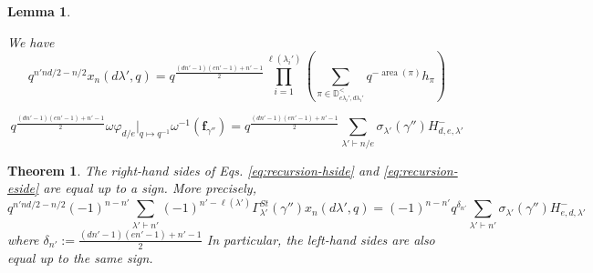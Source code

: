 \documentclass[10pt,a4paper]{amsart}
\newtheorem{lemma}{Lemma}
\newtheorem{theorem}{Theorem}
\newcommand{\Dyck}{\mathbb{D}}
\DeclareMathOperator{\area}{\mathrm{area}}
\begin{document}
\begin{lemma}
\label{lem:coareatoarea}

We have 
$$q^{n'nd/2-n/2}x_n(d\lambda',q)=q^{\frac{(dn'-1)(en'-1)+n'-1}{2}}\prod_{i=1}^{\ell(\lambda_i')}\left(\sum_{\pi\in\Dyck_{e\lambda_i',d\lambda_i'}^<}q^{-\area(\pi)}h_\pi\right)$$

\end{lemma}

\begin{equation}
\label{eq:recursion-eside}
q^{\frac{(dn'-1)(en'-1)+n'-1}{2}}\omega \varphi_{d/e}|_{q\mapsto q^{-1}} \omega^{-1} (\mathbf{f}_{\gamma''})=q^{\frac{(dn'-1)(en'-1)+n'-1}{2}}\sum_{\lambda'\vdash n/e} \sigma_{\lambda'}(\gamma'')
H_{d,e,\lambda'}^-
\end{equation} 

\begin{theorem}
\label{thm:comparerecursion}
The right-hand sides of Eqs. \eqref{eq:recursion-hside} and \eqref{eq:recursion-eside} are equal up to a sign. More precisely,
$$q^{n'n d/2-n/2}(-1)^{n-n'}\sum_{\lambda'\vdash n'} (-1)^{n'-\ell(\lambda')}\Gamma^{St}_{\lambda'}(\gamma'')x_n(d\lambda',q)=(-1)^{n-n'}q^{\delta_{n'}} \sum_{\lambda'\vdash n'} \sigma_{\lambda'}(\gamma'')H^-_{e,d,\lambda'}$$
where $\delta_{n'}:=\frac{(dn'-1)(en'-1)+n'-1}{2}$  In particular, the left-hand sides are also equal up to the same sign.

\end{theorem}
\end{document}
